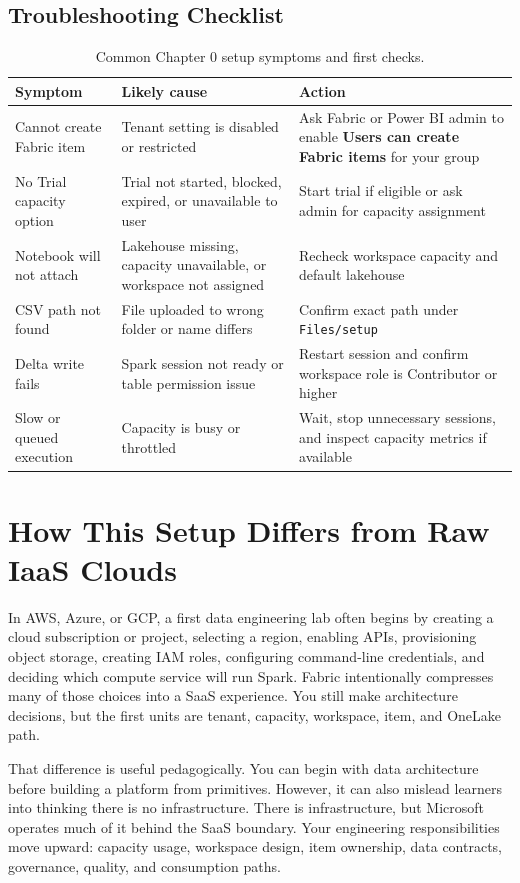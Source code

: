 \subsection{Troubleshooting Checklist}
\begin{table}[H]
\centering
\small
\begin{tabular}{@{}p{4.0cm}p{4.8cm}p{4.4cm}@{}}
\toprule
\textbf{Symptom} & \textbf{Likely cause} & \textbf{Action} \\
\midrule
Cannot create Fabric item & Tenant setting is disabled or restricted & Ask Fabric or Power BI admin to enable \textbf{Users can create Fabric items} for your group \\
No Trial capacity option & Trial not started, blocked, expired, or unavailable to user & Start trial if eligible or ask admin for capacity assignment \\
Notebook will not attach & Lakehouse missing, capacity unavailable, or workspace not assigned & Recheck workspace capacity and default lakehouse \\
CSV path not found & File uploaded to wrong folder or name differs & Confirm exact path under \texttt{Files/setup} \\
Delta write fails & Spark session not ready or table permission issue & Restart session and confirm workspace role is Contributor or higher \\
Slow or queued execution & Capacity is busy or throttled & Wait, stop unnecessary sessions, and inspect capacity metrics if available \\
\bottomrule
\end{tabular}
\caption{Common Chapter 0 setup symptoms and first checks.}
\label{tab:chapter0-troubleshooting}
\end{table}

\section{How This Setup Differs from Raw IaaS Clouds}
In AWS, Azure, or GCP, a first data engineering lab often begins by creating a cloud subscription or project, selecting a region, enabling APIs, provisioning object storage, creating IAM roles, configuring command-line credentials, and deciding which compute service will run Spark. Fabric intentionally compresses many of those choices into a SaaS experience. You still make architecture decisions, but the first units are tenant, capacity, workspace, item, and OneLake path.

That difference is useful pedagogically. You can begin with data architecture before building a platform from primitives. However, it can also mislead learners into thinking there is no infrastructure. There is infrastructure, but Microsoft operates much of it behind the SaaS boundary. Your engineering responsibilities move upward: capacity usage, workspace design, item ownership, data contracts, governance, quality, and consumption paths.

